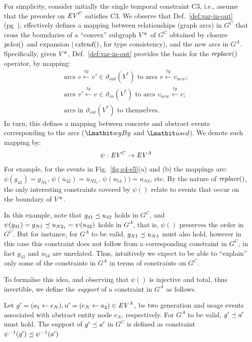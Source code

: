 For simplicity, consider initially the single temporal constraint C3, i.e., assume that the preorder on $\mathit{EV}^C$ satisfies C3.
We observe that Def.~\ref{def:var-in-out} (pg~\pageref{def:var-in-out}), effectively defines a mapping between relationships (graph arcs) in $G^C$ that cross the boundaries of a ``convex'' subgraph $V*$ of $G^C$ obtained by closure $\mathit{pclos}()$ and expansion ($\mathit{extend}()$, for type consistency), and the new arcs in $G^A$.
Specifically, given $V*$, Def.~\ref{def:var-in-out}  provides the basis for the $\mathit{replace}()$ operator, by mapping:
\begin{align}
\text{arcs }  v \xleftarrow{ty} v' \in \vartheta_{out}(V^*)  \text{ to arcs  } v \xleftarrow{ty}  v_{new}; \\
\text{arcs } v' \xleftarrow{ty} v \in \vartheta_{in}(V^*) \text{ to arcs  }v_{new} \xleftarrow{ty} v;\\
\text{arcs in } \vartheta_{int}(V^*) \text{ to themselves}.
\end{align}
In turn, this defines a mapping between concrete and abstract events corresponding to the arcs ($\wgby$ and $\used$). 
We denote such mapping by: 	 
\begin{align}
\psi: \mathit{EV}^C \rightarrow \mathit{EV}^A
\end{align}
For example, for the events in Fig.~\ref{fig:e4-e5}(a) and (b) the mappings are: $\psi(g_{41}) = g_{N1}$, $\psi(u_{42}) = u_{N2_1}$, $\psi(u_{54})) = u_{N4}$, etc.
By the nature of $\mathit{replace}()$, the only interesting constraints covered by $\psi()$ relate to events that occur on the boundary of $V*$.

In this example, note that $g_{41} \preceq u_{42}$ holds in $G^C$, and $\psi(g_{41}) = g_{N1} \preceq u_{N2_1} = \psi(u_{42})$ holds in $G^A$, that is, $\psi()$ preserves the order in $G^C$.
But for instance, for $G^A$ to be valid, $g_{N1} \preceq u_{N4}$ must also hold, however in this case this constraint does not follow from a corresponding constraint in $G^C$, in fact $g_{41}$ and $u_{54}$ are unrelated.
Thus, intuitively we expect to be able to ``explain'' only some of the constraints in $G^A$ in terms of constraints on $G^C$.

To formalise this idea, and observing that $\psi()$ is injective and total, thus invertible, we define the \textit{support} of a constraint in $G^A$ as follows.

\begin{definition}  \label{def:support}
	Let $g' = (a_1 \leftarrow e_N), u' = (e_N \leftarrow a_2) \in \mathit{EV}^A$,  be two generation and usage events associated with abstract entity node $e_N$, respectively.
    For $G^A$ to be valid, $g' \preceq a'$	must hold. 
    The support of $g' \preceq a'$ in $G^C$ is defined as constraint $\psi^{-1}(g') \preceq \psi^{-1}(a')$    
\end{definition}


